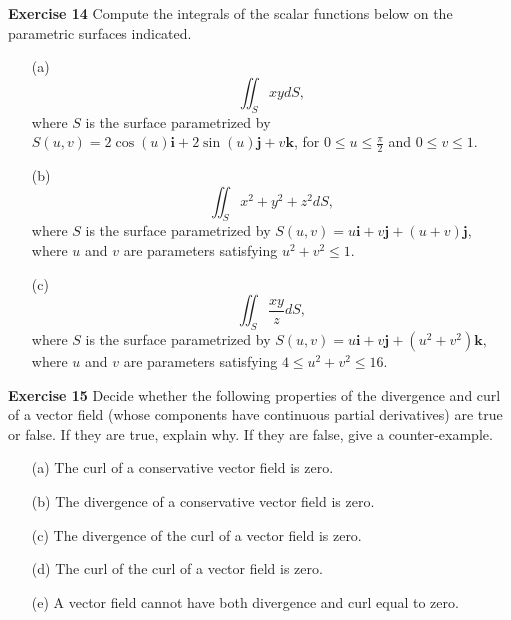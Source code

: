 \documentclass[12pt,oneside]{exam}
\newenvironment{exercise}[1]{\vspace{.1in}\noindent\textbf{Exercise #1 \hspace{.05em}}}{}
\begin{document}
\begin{exercise}{14}
Compute the integrals of the scalar functions below on the parametric surfaces indicated. 
\begin{itemize}
\item[(a)] 
\begin{equation*}
\iint_{S} xy dS, 
\end{equation*}
where $S$ is the surface parametrized by $S(u,v)= 2\cos(u) \textbf{i} + 2\sin(u)\textbf{j} + v\textbf{k}$, for $0 \leq u \leq \frac{\pi}{2}$ and $0 \leq v \leq 1$. 
\item[(b)] 
\begin{equation*}
\iint_{S}  x^2+y^2+z^2 dS, 
\end{equation*}
where $S$ is the surface parametrized by $S(u,v)=u\textbf{i} + v\textbf{j} + (u+v)\textbf{j}$, where $u$ and $v$ are parameters satisfying $u^2+v^2 \leq 1$. 
\item[(c)] 
\begin{equation*}
\iint_S \frac{xy}{z} dS, 
\end{equation*}
where $S$ is the surface parametrized by $S(u,v)=u\textbf{i} + v\textbf{j} + (u^2+v^2)\textbf{k}$, where $u$ and $v$ are parameters satisfying $4 \leq u^2+ v^2 \leq 16$. 
\end{itemize}
\end{exercise}

\begin{exercise}{15}
Decide whether the following properties of the divergence and curl of a vector field (whose components have continuous partial derivatives) are true or false. If they are true, explain why. If they are false, give a counter-example. 
\begin{itemize}
\item[(a)] The curl of a conservative vector field is zero. 
\item[(b)] The divergence of a conservative vector field is zero. 
\item[(c)] The divergence of the curl of a vector field is zero. 
\item[(d)]  The curl of the curl of a vector field is zero. 
\item[(e)] A vector field cannot have both divergence and curl equal to zero.
\end{itemize}
\end{exercise}
\end{document}
